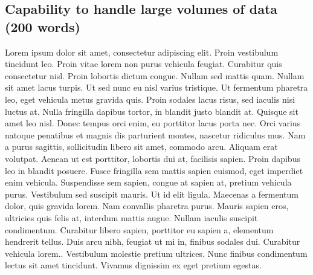 \documentclass[techmemo]{ecmwfrep}%
\begin{document}
\subsection{Capability to handle large volumes of data (200 words)}
Lorem ipsum dolor sit amet, consectetur adipiscing elit. Proin vestibulum tincidunt leo. Proin vitae lorem non purus vehicula feugiat. Curabitur quis consectetur nisl. Proin lobortis dictum congue. Nullam sed mattis quam. Nullam sit amet lacus turpis. Ut sed nunc eu nisl varius tristique. Ut fermentum pharetra leo, eget vehicula metus gravida quis. Proin sodales lacus risus, sed iaculis nisi luctus at. Nulla fringilla dapibus tortor, in blandit justo blandit at. Quisque sit amet leo nisl. Donec tempus orci enim, eu porttitor lacus porta nec. Orci varius natoque penatibus et magnis dis parturient montes, nascetur ridiculus mus. Nam a purus sagittis, sollicitudin libero sit amet, commodo arcu. Aliquam erat volutpat. Aenean ut est porttitor, lobortis dui at, facilisis sapien. Proin dapibus leo in blandit posuere. Fusce fringilla sem mattis sapien euismod, eget imperdiet enim vehicula. Suspendisse sem sapien, congue at sapien at, pretium vehicula purus. Vestibulum sed suscipit mauris. Ut id elit ligula. Maecenas a fermentum dolor, quis gravida lorem. Nam convallis pharetra purus. Mauris sapien eros, ultricies quis felis at, interdum mattis augue. Nullam iaculis suscipit condimentum. Curabitur libero sapien, porttitor eu sapien a, elementum hendrerit tellus. Duis arcu nibh, feugiat ut mi in, finibus sodales dui. Curabitur vehicula lorem.. Vestibulum molestie pretium ultrices. Nunc finibus condimentum lectus sit amet tincidunt. Vivamus dignissim ex eget pretium egestas.

\end{document}

